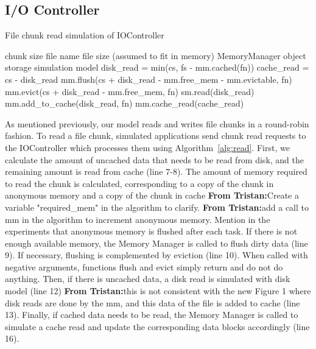 \documentclass[conference]{IEEEtran}
\newcommand{\Desc}[2]{\State \makebox[2em][l]{#1}#2}
\newcommand{\tristan}[1]{\color{orange}\textbf{From Tristan:}#1\color{black}}
\begin{document}
    \subsection{I/O Controller}
     
    \begin{algorithm}\caption{File chunk read simulation of IOController}
    \label{alg:read}
        \small
        \begin{algorithmic}[1]
            \Input
                \Desc{cs}{chunk size}
                \Desc{fn}{file name}
                \Desc{fs}{file size (assumed to fit in memory)}
                \Desc{mm}{MemoryManager object}
                \Desc{sm}{storage simulation model}
               \EndInput
               \State disk\_read = min(cs, fs - mm.cached(fn))
               \State cache\_read = cs - disk\_read
            \State mm.flush(cs + disk\_read - mm.free\_mem - mm.evictable, fn) 
            \State mm.evict(cs + disk\_read - mm.free\_mem, fn) 
                  
                \State sm.read(disk\_read)  
                \State mm.add\_to\_cache(disk\_read, fn)     
            \EndIf
             
                \State mm.cache\_read(cache\_read)  
            \EndIf
        \end{algorithmic}
    \end{algorithm}
    As mentioned previously, our model reads and writes file chunks in a
    round-robin fashion. To read a file chunk, simulated applications send
    chunk read requests to the IOController which processes them using
    Algorithm~\ref{alg:read}. First, we calculate the amount of uncached
    data that needs to be read from disk, and the remaining amount is read
    from cache (line 7-8). The amount of memory required to read the chunk
    is calculated, corresponding to a copy of the chunk in anonymous memory
    and a copy of the chunk in cache \tristan{Create a variable
    "required\_mem" in the algorithm to clarify}.
    \tristan{add a call to mm in the algorithm to increment anonymous memory. Mention in the experiments that anonymous memory is flushed after each task.}
    If there is not enough available memory, the Memory Manager is called
    to flush dirty data (line 9). If necessary, flushing is complemented by
    eviction (line 10). When called with negative arguments, functions
    flush and evict simply return and do not do anything. Then, if there is
    uncached data, a disk read is simulated with disk model (line 12)
    \tristan{this is not consistent with the new Figure 1 where disk reads
    are done by the mm}, and this data of the file is added to cache (line
    13).
    Finally, if cached data needs to be read, the Memory Manager is called
    to simulate a cache read  
    and update the corresponding data blocks accordingly (line 16).
\end{document}
